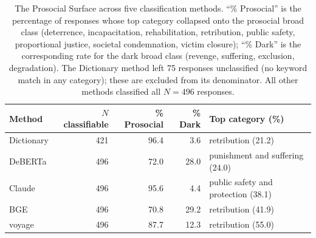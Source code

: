 \begin{table}[htbp]
  \centering
  \caption{The Prosocial Surface across five classification methods. ``\% Prosocial'' is the percentage of responses whose top category collapsed onto the prosocial broad class (deterrence, incapacitation, rehabilitation, retribution, public safety, proportional justice, societal condemnation, victim closure); ``\% Dark'' is the corresponding rate for the dark broad class (revenge, suffering, exclusion, degradation). The Dictionary method left 75 responses unclassified (no keyword match in any category); these are excluded from its denominator. All other methods classified all $N = 496$ responses.}
  \label{tab:nlp_method_summary}
  \small
  \begin{tabular}{lrrrl}
    \toprule
    Method & $N$ classifiable & \% Prosocial & \% Dark & Top category (\%) \\
    \midrule
    Dictionary & 421 & 96.4 & 3.6  & retribution (21.2) \\
    DeBERTa    & 496 & 72.0 & 28.0 & punishment and suffering (24.0) \\
    Claude     & 496 & 95.6 & 4.4  & public safety and protection (38.1) \\
    BGE        & 496 & 70.8 & 29.2 & retribution (41.9) \\
    voyage     & 496 & 87.7 & 12.3 & retribution (55.0) \\
    \bottomrule
  \end{tabular}
\end{table}
